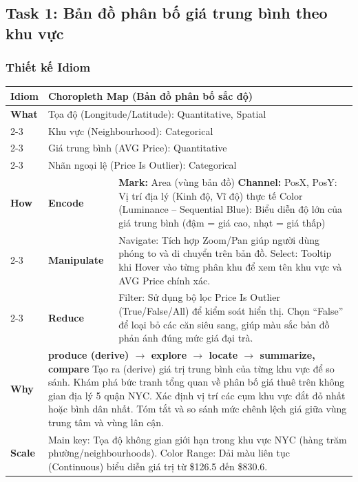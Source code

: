 \subsection{Task 1: Bản đồ phân bố giá trung bình theo khu vực}

\subsubsection{Thiết kế Idiom}

\begin{table}[H]
\centering
\renewcommand{\arraystretch}{1.1}
\begin{tabularx}{\textwidth}{|l|l|X|}
\hline
\textbf{Idiom} & \multicolumn{2}{l|}{\textbf{Choropleth Map (Bản đồ phân bố sắc độ)}} \\ \hline
\textbf{What}
& \multicolumn{2}{X|}{Tọa độ (Longitude/Latitude): Quantitative, Spatial} \\ \cline{2-3}
& \multicolumn{2}{X|}{Khu vực (Neighbourhood): Categorical} \\ \cline{2-3}
& \multicolumn{2}{X|}{Giá trung bình (AVG Price): Quantitative} \\ \cline{2-3}
& \multicolumn{2}{X|}{Nhãn ngoại lệ (Price Is Outlier): Categorical} \\ \hline
\textbf{How}
& \textbf{Encode} &
\textbf{Mark:} Area (vùng bản đồ) \newline
\textbf{Channel:} \newline
\hspace*{1em} PosX, PosY: Vị trí địa lý (Kinh độ, Vĩ độ) thực tế \newline
\hspace*{1em} Color (Luminance -- Sequential Blue): Biểu diễn độ lớn của giá trung bình (đậm = giá cao, nhạt = giá thấp) \\ \cline{2-3}
& \textbf{Manipulate} &
Navigate: Tích hợp Zoom/Pan giúp người dùng phóng to và di chuyển trên bản đồ. \newline
Select: Tooltip khi Hover vào từng phân khu để xem tên khu vực và AVG Price chính xác. \\ \cline{2-3}
& \textbf{Reduce} &
Filter: Sử dụng bộ lọc Price Is Outlier (True/False/All) để kiểm soát hiển thị. Chọn ``False'' để loại bỏ các căn siêu sang, giúp màu sắc bản đồ phản ánh đúng mức giá đại trà. \\ \hline
\textbf{Why} & \multicolumn{2}{X|}{
\textbf{produce (derive) $\rightarrow$ explore $\rightarrow$ locate $\rightarrow$ summarize, compare} \newline
Tạo ra (derive) giá trị trung bình của từng khu vực để so sánh. Khám phá bức tranh tổng quan về phân bố giá thuê trên không gian địa lý 5 quận NYC. Xác định vị trí các cụm khu vực đắt đỏ nhất hoặc bình dân nhất. Tóm tắt và so sánh mức chênh lệch giá giữa vùng trung tâm và vùng lân cận.
} \\ \hline
\textbf{Scale} & \multicolumn{2}{X|}{
Main key: Tọa độ không gian giới hạn trong khu vực NYC (hàng trăm phường/neighbourhoods). \newline
Color Range: Dải màu liên tục (Continuous) biểu diễn giá trị từ \$126.5 đến \$830.6.
} \\ \hline
\end{tabularx}
\end{table}


